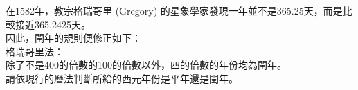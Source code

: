 在1582年，教宗格瑞哥里 (Gregory) 的星象學家發現一年並不是365.25天，而是比較接近365.2425天。\\
因此，閏年的規則便修正如下：\\
格瑞哥里法：\\
除了不是400的倍數的100的倍數以外，四的倍數的年份均為閏年。\\
請依現行的曆法判斷所給的西元年份是平年還是閏年。\\
